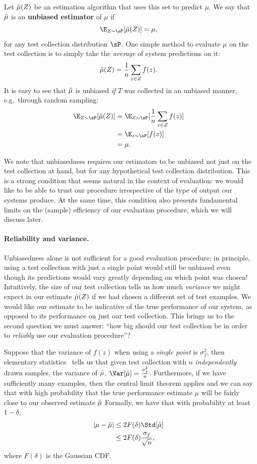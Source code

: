 Let $\hat{\mu}(Z)$ be an estimation algorithm that uses this set to predict $\mu$.
We say that $\hat{\mu}$ is an \textbf{unbiased estimator} of $\mu$ if
\[
\E_{Z\sim \sP}[\muh(Z)] = \mu,
\]
for any test collection distribution $\sP$. 
One simple method to evaluate $\mu$ on the test collection is to simply take the \textit{average} of system predictions on it:
\[
\hat{\mu}(Z) = \frac{1}{n} \sum_{z \in Z} f(z).
\]
It is easy to see that $\hat{\mu}$ is unbiased \textit{if} $T$ was collected in an unbiased manner, e.g.\ through random sampling:
\begin{align*}
  \E_{Z \sim \sP}[\muh(Z)] 
    &= \E_{Z \sim \sP}[\frac{1}{n} \sum_{z \in Z} f(z)] \\
    &= \E_{z \sim \sP}[f(z)] \\
    &= \mu.
\end{align*}

We note that unbiasedness requires our estimators to be unbiased not just on the test collection at hand, but for any hypothetical test collection distribution.
This is a strong condition that seems natural in the context of evaluation: we would like to be able to trust our procedure irrespective of the type of output our systems produce.
At the same time, this condition also presents fundamental limits on the (sample) efficiency of our evaluation procedure, which we will discuss later.

\paragraph{Reliability and variance.}
Unbiasedness alone is not sufficient for a good evaluation procedure: in principle, using a test collection with just a single point would still be unbiased even though its predictions would vary greatly depending on which point was chosen!
Intuitively, the size of our test collection tells us how much \textit{variance} we might expect in our estimate $\hat{\mu}(Z)$ if we had chosen a different set of test examples.  
We would like our estimate to be indicative of the true performance of our system, as opposed to its performance on just our test collection.
This brings us to the second question we must answer: ``how big should our test collection be in order to \textit{reliably} use our evaluation procedure''?

Suppose that the variance of $f(z)$ when using a \textit{single point} is $\sigma^2_f$, then
elementary statistics~\citep{casella1990statistical} tells us that given test collection with $n$ \textit{independently} drawn samples, the variance of $\hat{\mu}$, $\Var[\muh] = \frac{\sigma^2_f}{n}$.
Furthermore, if we have sufficiently many examples, then the central limit theorem applies and we can say that with high probability that the true performance estimate $\mu$ will be fairly close to our observed estimate $\hat{\mu}$
Formally, we have that with probability at least $1 - \delta$,
\begin{align*}
  |\mu - \muh| &\le 2F(\delta) \Std[\muh] \\
  &\le 2F(\delta) \frac{\sigma_f}{\sqrt{n}},
\end{align*}
where $F(\delta)$ is the Gaussian CDF.\@

